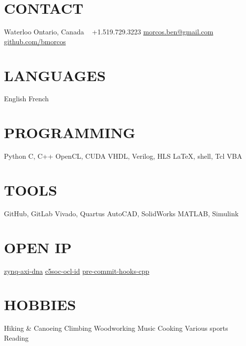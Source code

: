 \documentclass[a4paper,nocolors]{cv-friggeri-ben}
\begin{document}


\begin{aside} %
    \section{CONTACT}
    \hfill Waterloo
    \hfill Ontario, Canada
    ~
    \hfill +1.519.729.3223
    \hfill \href{mailto:morcos.ben@gmail.com}{morcos.ben@gmail.com}
    ~
    \hfill \href{https://github.com/bmorcos}{github.com/bmorcos}
    \section{LANGUAGES}
    English
    French
    \section{PROGRAMMING}
    Python
    C, C++
    OpenCL, CUDA
    VHDL, Verilog, HLS
    \LaTeX, shell, Tcl
    VBA
    \section{TOOLS}
    GitHub, GitLab
    Vivado, Quartus
    AutoCAD, SolidWorks
    MATLAB, Simulink
    \section{OPEN IP}
    \href{https://github.com/abr/zynq-axi-dna}{zynq-axi-dna}
    \href{https://github.com/abr/c5soc-ocl-id}{c5soc-ocl-id}
    \href{https://github.com/bmorcos/pre-commit-hooks-cpp}{pre-commit-hooks-cpp}
    \section{HOBBIES}
    Hiking \& Canoeing
    Climbing
    Woodworking
    Music
    Cooking
    Various sports
    Reading
\end{aside}


\end{document}
